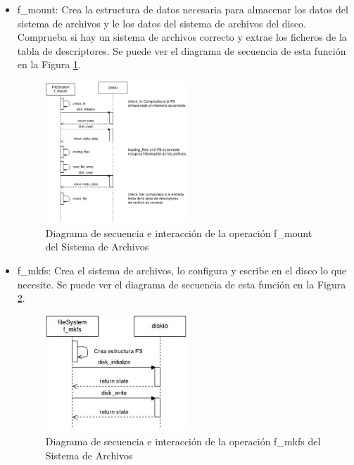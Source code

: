 \begin{itemize}
\item f\_mount: Crea la estructura de datos necesaria para almacenar los datos del sistema de archivos y le los datos del sistema de archivos del disco. Comprueba si hay un sistema de archivos correcto y extrae los ficheros de la tabla de descriptores. Se puede ver el diagrama de secuencia de esta función en la Figura \ref{fig:fmount}.\\

\begin{figure}[!h]
\begin{center}
\includegraphics[width=0.5\textwidth]{figs/fmount.png}
\caption{Diagrama de secuencia e interacción de la operación f\_mount del Sistema de Archivos}
\label{fig:fmount}
\end{center}
\end{figure}

\item f\_mkfs: Crea el sistema de archivos, lo configura y escribe en el disco lo que necesite. Se puede ver el diagrama de secuencia de esta función en la Figura \ref{fig:fmkfs}.\\

\begin{figure}[!h]
\begin{center}
\includegraphics[width=0.5\textwidth]{figs/fmkfs.png}
\caption{Diagrama de secuencia e interacción de la operación f\_mkfs del Sistema de Archivos}
\label{fig:fmkfs}
\end{center}
\end{figure}


\end{itemize}
